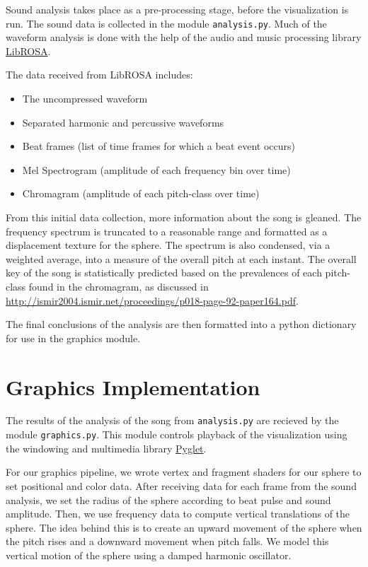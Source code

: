 \documentclass{article}
\newcommand{\code}{\texttt}
\begin{document}
Sound analysis takes place as a pre-processing stage, before the visualization is run. The sound data is collected in the module \code{analysis.py}. Much of the waveform analysis is done with the help of the audio and music processing library \href{https://github.com/bmcfee/librosa/}{LibROSA}.

The data received from LibROSA includes:

\begin{itemize}
    \item The uncompressed waveform
    \item Separated harmonic and percussive waveforms
    \item Beat frames (list of time frames for which a beat event occurs)
    \item Mel Spectrogram (amplitude of each frequency bin over time)
    \item Chromagram (amplitude of each pitch-class over time)
\end{itemize}

From this initial data collection, more information about the song is gleaned. The frequency spectrum is truncated to a reasonable range and formatted as a displacement texture for the sphere. The spectrum is also condensed, via a weighted average, into a measure of the overall pitch at each instant. The overall key of the song is statistically predicted based on the prevalences of each pitch-class found in the chromagram, as discussed in \url{http://ismir2004.ismir.net/proceedings/p018-page-92-paper164.pdf}. 

The final conclusions of the analysis are then formatted into a python dictionary for use in the graphics module.

\section{Graphics Implementation}

The results of the analysis of the song from \code{analysis.py} are recieved by the module \code{graphics.py}. This module controls playback of the visualization using the windowing and multimedia library \href{http://www.pyglet.org/}{Pyglet}.

For our graphics pipeline, we wrote vertex and fragment shaders for our sphere to set positional and color data. After receiving data for each frame from the sound analysis, we set the radius of the sphere according to beat pulse and sound amplitude. Then, we use frequency data to compute vertical translations of the sphere. The idea behind this is to create an upward movement of the sphere when the pitch rises and a downward movement when pitch falls. We model this vertical motion of the sphere using a damped harmonic oscillator. 
\end{document}
